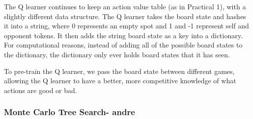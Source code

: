 \documentclass[12pt]{article}
\begin{document}
The Q learner continues to keep an action value table (as in Practical 1), with a slightly different data structure. The Q learner takes the board state and hashes it into a string, where 0 represents an empty spot and 1 and -1 represent self and opponent tokens. It then adds the string board state as a key into a dictionary. For computational reasons, instead of adding all of the possible board states to the dictionary, the dictionary only ever holds board states that it has seen. 

To pre-train the Q learner, we pass the board state between different games, allowing the Q learner to have a better, more competitive knowledge of what actions are good or bad.

\subsubsection{Monte Carlo Tree Search- andre} 
\end{document}
